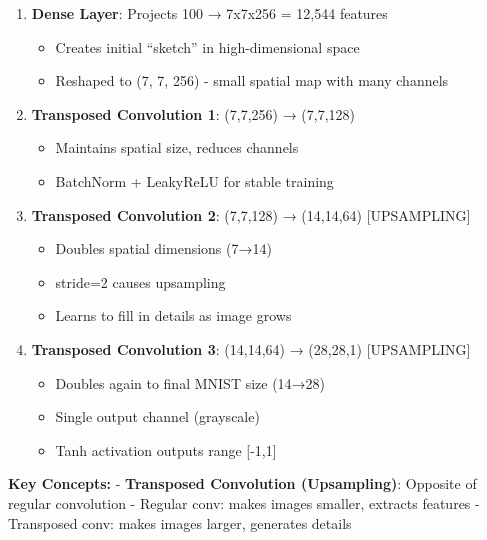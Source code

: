 \documentclass[11pt]{article}
\providecommand{\tightlist}{%
      \setlength{\itemsep}{0pt}\setlength{\parskip}{0pt}}
\begin{document}
\begin{enumerate}
\def\labelenumi{\arabic{enumi}.}
\setcounter{enumi}{1}
\tightlist
\item
  \textbf{Dense Layer}: Projects 100 → 7x7x256 = 12,544 features

  \begin{itemize}
  \tightlist
  \item
    Creates initial ``sketch'' in high-dimensional space
  \item
    Reshaped to (7, 7, 256) - small spatial map with many channels
  \end{itemize}
\item
  \textbf{Transposed Convolution 1}: (7,7,256) → (7,7,128)

  \begin{itemize}
  \tightlist
  \item
    Maintains spatial size, reduces channels
  \item
    BatchNorm + LeakyReLU for stable training
  \end{itemize}
\item
  \textbf{Transposed Convolution 2}: (7,7,128) → (14,14,64)
  {[}UPSAMPLING{]}

  \begin{itemize}
  \tightlist
  \item
    Doubles spatial dimensions (7→14)
  \item
    stride=2 causes upsampling
  \item
    Learns to fill in details as image grows
  \end{itemize}
\item
  \textbf{Transposed Convolution 3}: (14,14,64) → (28,28,1)
  {[}UPSAMPLING{]}

  \begin{itemize}
  \tightlist
  \item
    Doubles again to final MNIST size (14→28)
  \item
    Single output channel (grayscale)
  \item
    Tanh activation outputs range {[}-1,1{]}
  \end{itemize}
\end{enumerate}

\textbf{Key Concepts:} - \textbf{Transposed Convolution (Upsampling)}:
Opposite of regular convolution - Regular conv: makes images smaller,
extracts features - Transposed conv: makes images larger, generates
details
\end{document}
